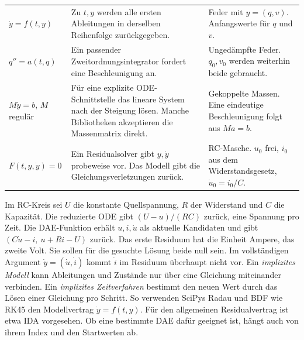 {\tblstart\begin{tabularx}{\linewidth}{@{}P{29mm}YY@{}}\toprule
{}&&\\\midrule
\(\dot y=f(t,y)\)&Zu \(t,y\) werden alle ersten Ableitungen in derselben Reihenfolge zurückgegeben.&Feder mit \(y=(q,v)\). Anfangswerte für \(q\) und \(v\).\\
\(q''=a(t,q)\)&Ein passender Zweitordnungsintegrator fordert eine Beschleunigung an.&Ungedämpfte Feder. \(q_0,v_0\) werden weiterhin beide gebraucht.\\
\(M\dot y=b\), \(M\) regulär&Für eine explizite ODE-Schnittstelle das lineare System nach der Steigung lösen. Manche Bibliotheken akzeptieren die Massenmatrix direkt.&Gekoppelte Massen. Eine eindeutige Beschleunigung folgt aus \(Ma=b\).\\
\(F(t,y,\dot y)=0\)&Ein Residualsolver gibt \(y,\dot y\) probeweise vor. Das Modell gibt die Gleichungsverletzungen zurück.&RC-Masche. \(u_0\) frei, \(i_0\) aus dem Widerstandsgesetz, \(\dot u_0=i_0/C\).\\\bottomrule\end{tabularx}\par}
Im RC-Kreis sei \(U\) die konstante Quellspannung, \(R\) der Widerstand und \(C\) die Kapazität. Die reduzierte ODE gibt \((U-u)/(RC)\) zurück, eine Spannung pro Zeit. Die DAE-Funktion erhält \(u,i,\dot u\) als aktuelle Kandidaten und gibt \((C\dot u-i,\ u+Ri-U)\) zurück. Das erste Residuum hat die Einheit Ampere, das zweite Volt. Sie sollen für die gesuchte Lösung beide null sein. Im vollständigen Argument \(\dot y=(\dot u,\dot i)\) kommt \(\dot i\) im Residuum überhaupt nicht vor.
Ein \emph{implizites Modell} kann Ableitungen und Zustände nur über eine Gleichung miteinander verbinden. Ein \emph{implizites Zeitverfahren} bestimmt den neuen Wert durch das Lösen einer Gleichung pro Schritt. So verwenden SciPys Radau und BDF wie RK45 den Modellvertrag \(\dot y=f(t,y)\). Für den allgemeinen Residualvertrag ist etwa IDA vorgesehen. Ob eine bestimmte DAE dafür geeignet ist, hängt auch von ihrem Index und den Startwerten ab.

